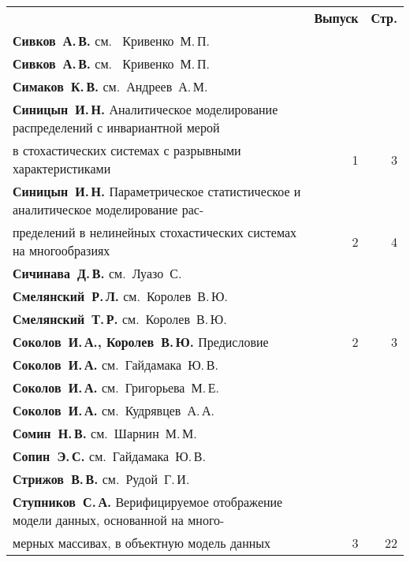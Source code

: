 \def\rightkol{АВТОРСКИЙ УКАЗАТЕЛЬ ЗА 2013 г.} %

{\tabcolsep=3pt
\begin{tabular}{p{388pt}rr}
&\textbf{Выпуск} & \textbf{Стр.}\\[3pt]
\textbf{Сивков~А.\,В.} см.~ Кривенко~М.\,П.&&\\
\textbf{Сивков~А.\,В.} см.~ Кривенко~М.\,П.&&\\
\textbf{Симаков~К.\,В.} см.~Андреев~А.\,М.&&\\
\textbf{Синицын~И.\,Н.}
Аналитическое моделирование распределений с инвариантной мерой\linebreak
\vspace*{-12pt}\\
\hspace*{23pt}в стохастических системах с разрывными характеристиками\dotfill&1&3\\
\textbf{Синицын~И.\,Н.}
Параметрическое статистическое и аналитическое моделирование рас-\linebreak
\vspace*{-12pt}\\
\hspace*{23pt}пределений в
нелинейных стохастических системах на многообразиях\dotfill&2&4\\
\textbf{Сичинава~Д.\,В.} см.~Луазо~С.&&\\
\textbf{Смелянский~Р.\,Л.} см.~Королев~В.\,Ю.&&\\
\textbf{Смелянский~Т.\,Р.} см.~Королев~В.\,Ю.&&\\
\textbf{Соколов~И.\,А., Королев~В.\,Ю.}
Предисловие\dotfill&2&3\\
\textbf{Соколов~И.\,А.} см.~Гайдамака~Ю.\,В.&&\\
\textbf{Соколов~И.\,А.} см.~Григорьева~М.\,Е.&&\\
\textbf{Соколов~И.\,А.} см.~Кудрявцев~А.\,А.&&\\
\textbf{Сомин~Н.\,В.} см.~Шарнин~М.\,М.&&\\
\textbf{Сопин~Э.\,С.} см.~Гайдамака~Ю.\,В.&&\\
\textbf{Стрижов~В.\,В.} см.~Рудой~Г.\,И.&&\\
\textbf{Ступников~С.\,А.}
Верифицируемое отображение модели данных, основанной на много-\linebreak
\vspace*{-12pt}\\
\hspace*{23pt}мерных массивах, в объектную модель данных\dotfill&3&22\\

\end{tabular}}
